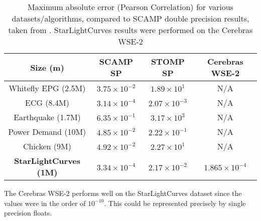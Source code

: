 \begin{table}[h!]
    \centering
    \renewcommand{\arraystretch}{1.25} %
    \caption{Maximum absolute error (Pearson Correlation) for
    various datasets/algorithms, compared to SCAMP double precision results, taken from \cite{4}. StarLightCurves results were performed on the Cerebras WSE-2}
    \begin{tabular}{|| c | c | c | c ||} 
        \hline
        Size (m) & SCAMP SP & STOMP SP & Cerebras WSE-2 \\ [0.5ex] 
        \hline\hline
        Whitefly EPG (2.5M) & $3.75 \times 10^{-2}$ & $1.89 \times 10^{1}$ & N/A \\
        \hline
        ECG (8.4M) & $3.14 \times 10^{-4}$ & $2.07 \times 10^{-3}$ & N/A \\
        \hline
        Earthquake (1.7M) & $6.35 \times 10^{-1}$ & $3.17 \times 10^{3}$ & N/A \\
        \hline
        Power Demand (10M) & $4.85 \times 10^{-2}$ & $2.22 \times 10^{-1}$ & N/A \\
        \hline
        Chicken (9M) & $4.92 \times 10^{-2}$ & $2.27 \times 10^{1}$ & N/A \\
        \hline
        \textbf{StarLightCurves (1M)} & \textbf{$3.34 \times 10^{-4}$} & \textbf{$2.17 \times 10^{-2}$} &  \textbf{$1.865 \times 10^{-4}$} \\
        \hline
    \end{tabular}
    \label{tbl:max_absolute_error}
\end{table}

The Cerebras WSE-2 performs well on the StarLightCurves dataset since the values were in the order of $10^{-10}$. This could be represented precisely by single precision floats.